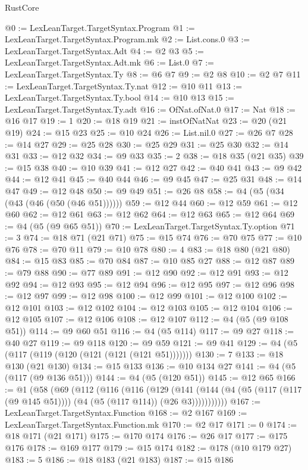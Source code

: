 \begin{lexlean}{RustCore}
\begin{coremodule}
@0 := LexLeanTarget.TargetSyntax.Program
@1 := LexLeanTarget.TargetSyntax.Program.mk
@2 := List.cons.{0}
@3 := LexLeanTarget.TargetSyntax.Adt
@4 := @2 @3
@5 := LexLeanTarget.TargetSyntax.Adt.mk
@6 := List.{0}
@7 := LexLeanTarget.TargetSyntax.Ty
@8 := @6 @7
@9 := @2 @8
@10 := @2 @7
@11 := LexLeanTarget.TargetSyntax.Ty.nat
@12 := @10 @11
@13 := LexLeanTarget.TargetSyntax.Ty.bool
@14 := @10 @13
@15 := LexLeanTarget.TargetSyntax.Ty.adt
@16 := OfNat.ofNat.{0}
@17 := Nat
@18 := @16 @17
@19 := 1
@20 := @18 @19
@21 := instOfNatNat
@23 := @20 (@21 @19)
@24 := @15 @23
@25 := @10 @24
@26 := List.nil.{0}
@27 := @26 @7
@28 := @14 @27
@29 := @25 @28
@30 := @25 @29
@31 := @25 @30
@32 := @14 @31
@33 := @12 @32
@34 := @9 @33
@35 := 2
@38 := @18 @35 (@21 @35)
@39 := @15 @38
@40 := @10 @39
@41 := @12 @27
@42 := @40 @41
@43 := @9 @42
@44 := @12 @41
@45 := @40 @44
@46 := @9 @45
@47 := @25 @31
@48 := @14 @47
@49 := @12 @48
@50 := @9 @49
@51 := @26 @8
@58 := @4 (@5 (@34 (@43 (@46 (@50 (@46 @51))))))
@59 := @12 @44
@60 := @12 @59
@61 := @12 @60
@62 := @12 @61
@63 := @12 @62
@64 := @12 @63
@65 := @12 @64
@69 := @4 (@5 (@9 @65 @51))
@70 := LexLeanTarget.TargetSyntax.Ty.option
@71 := 3
@74 := @18 @71 (@21 @71)
@75 := @15 @74
@76 := @70 @75
@77 := @10 @76
@78 := @70 @11
@79 := @10 @78
@80 := 4
@83 := @18 @80 (@21 @80)
@84 := @15 @83
@85 := @70 @84
@87 := @10 @85 @27
@88 := @12 @87
@89 := @79 @88
@90 := @77 @89
@91 := @12 @90
@92 := @12 @91
@93 := @12 @92
@94 := @12 @93
@95 := @12 @94
@96 := @12 @95
@97 := @12 @96
@98 := @12 @97
@99 := @12 @98
@100 := @12 @99
@101 := @12 @100
@102 := @12 @101
@103 := @12 @102
@104 := @12 @103
@105 := @12 @104
@106 := @12 @105
@107 := @12 @106
@108 := @12 @107
@112 := @4 (@5 (@9 @108 @51))
@114 := @9 @60 @51
@116 := @4 (@5 @114)
@117 := @9 @27
@118 := @40 @27
@119 := @9 @118
@120 := @9 @59
@121 := @9 @41
@129 := @4 (@5 (@117 (@119 (@120 (@121 (@121 (@121 @51)))))))
@130 := 7
@133 := @18 @130 (@21 @130)
@134 := @15 @133
@136 := @10 @134 @27
@141 := @4 (@5 (@117 (@9 @136 @51)))
@144 := @4 (@5 (@120 @51))
@145 := @12 @65
@166 := @1
    (@58
      (@69
        (@112
          (@116
            (@116
              (@129
                (@141
                  (@144 (@4 (@5 (@117 (@117 (@9 @145 @51)))) (@4 (@5 (@117 @114)) (@26 @3)))))))))))
@167 := LexLeanTarget.TargetSyntax.Function
@168 := @2 @167
@169 := LexLeanTarget.TargetSyntax.Function.mk
@170 := @2 @17
@171 := 0
@174 := @18 @171 (@21 @171)
@175 := @170 @174
@176 := @26 @17
@177 := @175 @176
@178 := @169 @177
@179 := @15 @174
@182 := @178 (@10 @179 @27)
@183 := 5
@186 := @18 @183 (@21 @183)
@187 := @15 @186

\end{coremodule}
\end{lexlean}
